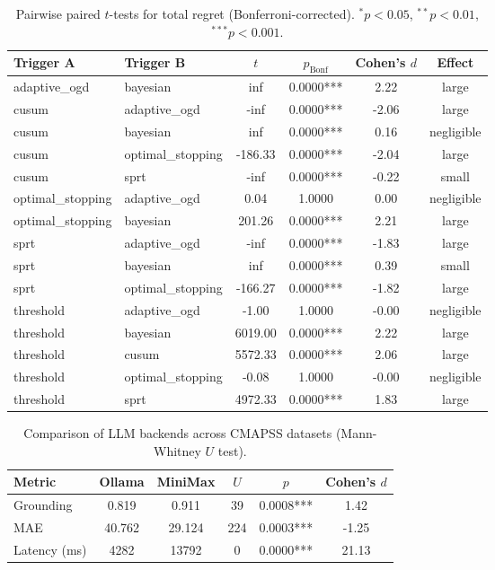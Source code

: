 \begin{table}[t]
\centering
\caption{Pairwise paired $t$-tests for total regret (Bonferroni-corrected). $^{*}p<0.05$, $^{**}p<0.01$, $^{***}p<0.001$.}
\label{tab:pairwise-regret}
\small
\begin{tabular}{llcccc}
\toprule
Trigger A & Trigger B & $t$ & $p_{\mathrm{Bonf}}$ & Cohen's $d$ & Effect \\
\midrule
  adaptive\_ogd & bayesian & inf & 0.0000*** & 2.22 & large \\
  cusum & adaptive\_ogd & -inf & 0.0000*** & -2.06 & large \\
  cusum & bayesian & inf & 0.0000*** & 0.16 & negligible \\
  cusum & optimal\_stopping & -186.33 & 0.0000*** & -2.04 & large \\
  cusum & sprt & -inf & 0.0000*** & -0.22 & small \\
  optimal\_stopping & adaptive\_ogd & 0.04 & 1.0000 & 0.00 & negligible \\
  optimal\_stopping & bayesian & 201.26 & 0.0000*** & 2.21 & large \\
  sprt & adaptive\_ogd & -inf & 0.0000*** & -1.83 & large \\
  sprt & bayesian & inf & 0.0000*** & 0.39 & small \\
  sprt & optimal\_stopping & -166.27 & 0.0000*** & -1.82 & large \\
  threshold & adaptive\_ogd & -1.00 & 1.0000 & -0.00 & negligible \\
  threshold & bayesian & 6019.00 & 0.0000*** & 2.22 & large \\
  threshold & cusum & 5572.33 & 0.0000*** & 2.06 & large \\
  threshold & optimal\_stopping & -0.08 & 1.0000 & -0.00 & negligible \\
  threshold & sprt & 4972.33 & 0.0000*** & 1.83 & large \\
\bottomrule
\end{tabular}
\end{table}

\begin{table}[t]
\centering
\caption{Comparison of LLM backends across CMAPSS datasets (Mann-Whitney $U$ test).}
\label{tab:llm-backend}
\small
\begin{tabular}{lccccc}
\toprule
Metric & Ollama & MiniMax & $U$ & $p$ & Cohen's $d$ \\
\midrule
  Grounding & 0.819 & 0.911 & 39 & 0.0008*** & 1.42 \\
  MAE & 40.762 & 29.124 & 224 & 0.0003*** & -1.25 \\
  Latency (ms) & 4282 & 13792 & 0 & 0.0000*** & 21.13 \\
\bottomrule
\end{tabular}
\end{table}
